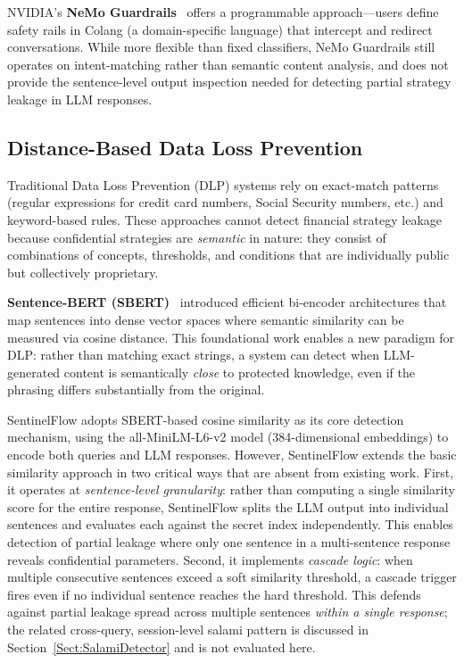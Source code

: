 \documentclass[journal]{IEEEtran}
\begin{document}
NVIDIA's \textbf{NeMo Guardrails}~\cite{nemo_guardrails} offers a programmable approach---users define safety rails in Colang (a domain-specific language) that intercept and redirect conversations. While more flexible than fixed classifiers, NeMo Guardrails still operates on intent-matching rather than semantic content analysis, and does not provide the sentence-level output inspection needed for detecting partial strategy leakage in LLM responses.

\subsection{Distance-Based Data Loss Prevention}
\label{Sect:LR_DLP}

Traditional Data Loss Prevention (DLP) systems rely on exact-match patterns (regular expressions for credit card numbers, Social Security numbers, etc.) and keyword-based rules. These approaches cannot detect financial strategy leakage because confidential strategies are \textit{semantic} in nature: they consist of combinations of concepts, thresholds, and conditions that are individually public but collectively proprietary.

\textbf{Sentence-BERT (SBERT)}~\cite{sbert} introduced efficient bi-encoder architectures that map sentences into dense vector spaces where semantic similarity can be measured via cosine distance. This foundational work enables a new paradigm for DLP: rather than matching exact strings, a system can detect when LLM-generated content is semantically \textit{close} to protected knowledge, even if the phrasing differs substantially from the original.

SentinelFlow adopts SBERT-based cosine similarity as its core detection mechanism, using the all-MiniLM-L6-v2 model (384-dimensional embeddings) to encode both queries and LLM responses. However, SentinelFlow extends the basic similarity approach in two critical ways that are absent from existing work. First, it operates at \textit{sentence-level granularity}: rather than computing a single similarity score for the entire response, SentinelFlow splits the LLM output into individual sentences and evaluates each against the secret index independently. This enables detection of partial leakage where only one sentence in a multi-sentence response reveals confidential parameters. Second, it implements \textit{cascade logic}: when multiple consecutive sentences exceed a soft similarity threshold, a cascade trigger fires even if no individual sentence reaches the hard threshold. This defends against partial leakage spread across multiple sentences \textit{within a single response}; the related cross-query, session-level salami pattern is discussed in Section~\ref{Sect:SalamiDetector} and is not evaluated here.
\end{document}
